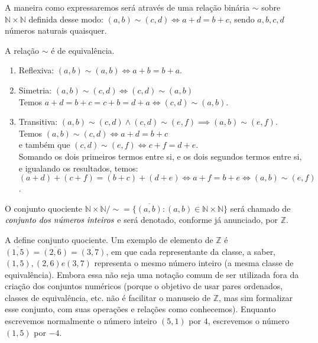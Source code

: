 \documentclass[../main.tex]{subfiles}
\begin{document}
A maneira como expressaremos será através de uma relação binária $\sim$ sobre $\mathbb{N} \times \mathbb{N}$ definida desse modo: $(a,b) \sim (c,d) \iff a+d = b+c$, sendo $a,b,c,d$ números naturais quaisquer.
\begin{teo}
    A relação $\sim$ é de equivalência.
\end{teo}
\begin{dem}
    \begin{enumerate}[label=(\roman*)]
        \item Reflexiva: $(a,b) \sim (a,b) \iff a+b=b+a$.
        \item Simetria: $(a,b) \sim (c,d) \iff (c,d) \sim (a,b)$ \\
        Temos $ a+d = b+c = c+b = d+a \iff (c,d) \sim (a,b)$.
        \item Transitiva: $(a,b) \sim (c,d) \land (c,d) \sim (e,f) \implies (a,b) \sim (e,f)$. \\
        Temos $(a,b) \sim (c,d) \iff a+d=b+c$ \\
        e também que $(c,d) \sim (e,f) \iff c+f=d+e$. \\
        Somando os dois primeiros termos entre si, e os dois segundos termos entre si, e igualando os resultados, temos: \\ 
        $(a+d)+(c+f)= (b+c)+(d+e) \iff a+f = b+e \iff (a,b) \sim (e,f)$.
    \end{enumerate}
\end{dem}
\begin{defi}\label{int-def-conjNum}
    O conjunto quociente $\mathbb{N} \times \mathbb{N} / \sim = \{ \overline{(a,b)}: (a,b) \in \mathbb{N} \times \mathbb{N}\}$ será chamado de $\emph{conjunto dos números inteiros}$ e será denotado, conforme já anunciado, por $\mathbb{Z}$.
\end{defi}
A  define conjunto quociente. Um exemplo de elemento de $\mathbb{Z}$ é $\overline{(1,5)} = \overline{(2,6)} = \overline{(3,7)}$, em que cada representante da classe, a saber, $(1,5), (2,6) e (3,7)$ representa o mesmo número inteiro (a mesma classe de equivalência). Embora essa não seja uma notação comum de ser utilizada fora da criação dos conjuntos numéricos (porque o objetivo de usar pares ordenados, classes de equivalência, etc. não é facilitar o manuseio de $\mathbb{Z}$, mas sim formalizar esse conjunto, com suas operações e relações como conhecemos). Enquanto escrevemos normalmente o número inteiro $(5,1)$ por $4$, escrevemos o número $(1,5)$ por $-4$.
\end{document}
